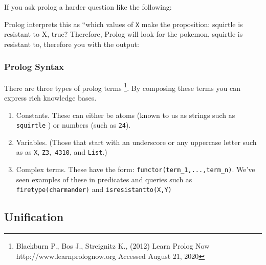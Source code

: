 If you ask prolog a harder question like the following:

\begin{Shaded}
\begin{Highlighting}[]
\KeywordTok{,}\NormalTok{)}
\end{Highlighting}
\end{Shaded}

Prolog interprets this as ``which values of \texttt{X} make the
proposition: squirtle is resistant to X, true? Therefore, Prolog will
look for the pokemon, squirtle is resistant to, therefore you with the
output:

\begin{Shaded}
\begin{Highlighting}[]
 \KeywordTok{=}
 \KeywordTok{=}
 \KeywordTok{=}
\end{Highlighting}
\end{Shaded}

\subsubsection{Prolog
Syntax}\label{logic-programming-paradigm.md__prolog-syntax}

There are three types of prolog terms \footnote{Blackburn P., Bos J.,
  Streignitz K., (2012) Learn Prolog Now http://www.learnprolognow.org
  Accessed August 21, 2020}. By composing these terms you can express
rich knowledge bases.

\begin{enumerate}
\def\labelenumi{\arabic{enumi}.}
\item
  Constants. These can either be atoms (known to us as strings such as
  \texttt{squirtle} ) or numbers (such as \texttt{24}).
\item
  Variables. (Those that start with an underscore or any uppercase
  letter such as as \texttt{X}, \texttt{Z3},\texttt{\_4310}, and
  \texttt{List}.)
\item
  Complex terms. These have the form:
  \texttt{functor(term\_1,...,term\_n)}. We've seen examples of these in
  predicates and queries such as \texttt{firetype(charmander)} and
  \texttt{isresistantto(X,Y)}
\end{enumerate}

\subsection{Unification}\label{logic-programming-paradigm.md__unification}

